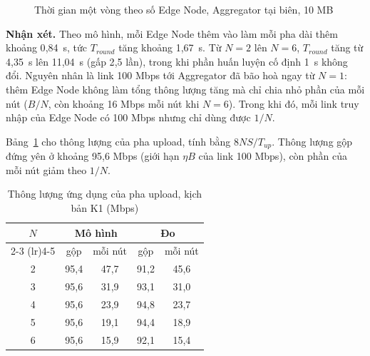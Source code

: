 \begin{figure}[H]
    \centering
    \caption{Thời gian một vòng theo số Edge Node, Aggregator tại biên, 10 MB}
    \label{fig:q1}
\end{figure}

\textbf{Nhận xét.} Theo mô hình, mỗi Edge Node thêm vào làm mỗi pha dài thêm khoảng 0{,}84~s, tức $T_{round}$ tăng khoảng 1{,}67~s. Từ $N = 2$ lên $N = 6$, $T_{round}$ tăng từ 4{,}35~s lên 11{,}04~s (gấp 2{,}5 lần), trong khi phần huấn luyện cố định 1~s không đổi. Nguyên nhân là link 100 Mbps tới Aggregator đã bão hoà ngay từ $N = 1$: thêm Edge Node không làm tổng thông lượng tăng mà chỉ chia nhỏ phần của mỗi nút ($B/N$, còn khoảng 16 Mbps mỗi nút khi $N = 6$). Trong khi đó, mỗi link truy nhập của Edge Node có 100 Mbps nhưng chỉ dùng được $1/N$.

Bảng~\ref{tab:q1thr} cho thông lượng của pha upload, tính bằng $8NS/T_{up}$. Thông lượng gộp đứng yên ở khoảng 95{,}6 Mbps (giới hạn $\eta B$ của link 100 Mbps), còn phần của mỗi nút giảm theo $1/N$.

\begin{table}[H]
    \centering
    \caption{Thông lượng ứng dụng của pha upload, kịch bản K1 (Mbps)}
    \label{tab:q1thr}
    \begin{tabular}{c c c c c}
        \toprule
        \multirow{2}{*}{$N$} & \multicolumn{2}{c}{\textbf{Mô hình}} & \multicolumn{2}{c}{\textbf{Đo}} \\
        \cmidrule(lr){2-3} \cmidrule(lr){4-5}
        & gộp & mỗi nút & gộp & mỗi nút \\
        \midrule
        2 & 95,4 & 47,7 & 91,2 & 45,6 \\
        3 & 95,6 & 31,9 & 93,1 & 31,0 \\
        4 & 95,6 & 23,9 & 94,8 & 23,7 \\
        5 & 95,6 & 19,1 & 94,4 & 18,9 \\
        6 & 95,6 & 15,9 & 92,1 & 15,4 \\
        \bottomrule
    \end{tabular}
\end{table}

